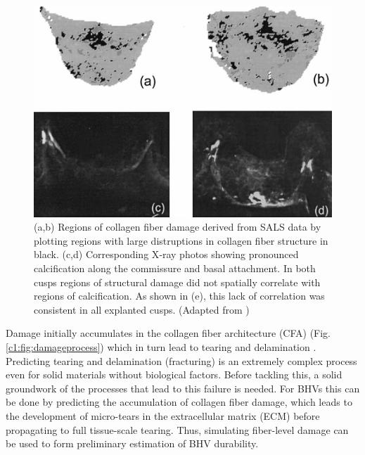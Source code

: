 \begin{figure}
\centering
\includegraphics[width=5.0in]{Images/chapter1/calcificationdamage.jpg}
\caption{(a,b) Regions of collagen fiber damage derived from SALS data by plotting regions with large distruptions in collagen fiber structure in black. (c,d) Corresponding X‐ray photos showing pronounced calcification along the commissure and basal attachment. In both cusps regions of structural damage did not spatially correlate with regions of calcification. As shown in (e), this lack of correlation was consistent in all explanted cusps. (Adapted from \cite{sacks_collagen_2002})}
\label{c1:fig:calcificationdamage}
\end{figure}



    Damage initially accumulates in the collagen fiber architecture (CFA) (Fig. \ref{c1:fig:damageprocess}) which in turn lead to tearing and delamination \cite{vyavahare_mechanisms_1999}. Predicting tearing and delamination (fracturing) is an extremely complex process even for solid materials without biological factors. Before tackling this, a solid groundwork of the processes that lead to this failure is needed. For BHVs this can be done by predicting the accumulation of collagen fiber damage, which leads to the development of micro-tears in the extracellular matrix (ECM) before propagating to full tissue-scale tearing. Thus, simulating fiber-level damage can be used to form preliminary estimation of BHV durability. 

